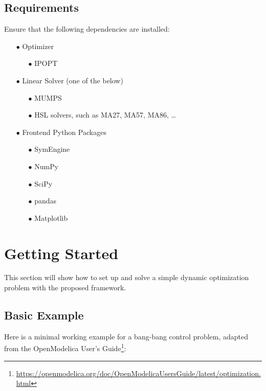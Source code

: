 \documentclass[12pt]{article}
\begin{document}
	\subsection{Requirements}
	Ensure that the following dependencies are installed:
	\begin{itemize}
		
	\item[$\bullet$] Optimizer
	
		\begin{itemize}
			\item[$\bullet$] IPOPT
		\end{itemize}
	
	\item[$\bullet$] Linear Solver (one of the below)
	
		\begin{itemize}
			\item[$\bullet$] MUMPS
			\item[$\bullet$] HSL solvers, such as MA27, MA57, MA86, \ldots
		\end{itemize}

	\item[$\bullet$] Frontend Python Packages
	
		\begin{itemize}
			\item[$\bullet$] SymEngine
			\item[$\bullet$] NumPy
			\item[$\bullet$] SciPy
			\item[$\bullet$] pandas
			\item[$\bullet$] Matplotlib
		\end{itemize}
	\end{itemize}

	\section{Getting Started}
	This section will show how to set up and solve a simple dynamic optimization problem with the proposed framework.
	
	\subsection{Basic Example}
	Here is a minimal working example for a bang-bang control problem, adapted from the OpenModelica User's Guide\footnote{\url{https://openmodelica.org/doc/OpenModelicaUsersGuide/latest/optimization.html}}:
	
\end{document}
